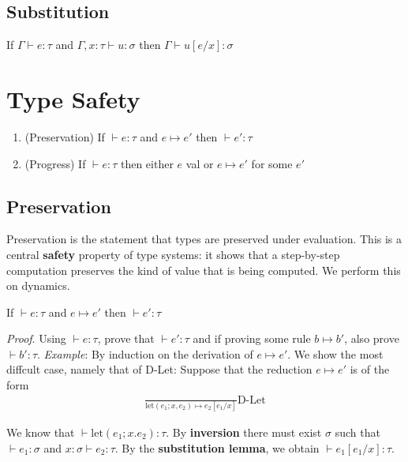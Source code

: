 \documentclass[11pt,a4paper,titlepage,dvipsnames,cmyk]{scrartcl}
\begin{document}
\subsection{Substitution}
\begin{tcolorbox} [space to upper,
collower=white,
title={Lemma 3 (Substitution)},
nobeforeafter,
halign lower=flush right, ]
If $\Gamma \vdash e : \tau$ and $\Gamma, x : \tau \vdash u : \sigma$ then $\Gamma \vdash u[e/x] : \sigma$
\end{tcolorbox}

\newpage
\section{Type Safety}

\begin{tcolorbox} [space to upper,
collower=white,
title={Theorem 1 (Type safety)},
nobeforeafter,
halign lower=flush right, ]
\begin{enumerate}
\item (Preservation) If $\vdash e : \tau$ and $e \mapsto e'$ then $\vdash e' : \tau$
\item (Progress) If $\vdash e : \tau$ then either $e$ val or $e \mapsto e'$ for some $e'$
\end{enumerate}
\end{tcolorbox}

\subsection{Preservation}
Preservation is the statement that types are preserved under evaluation. This is a central \textbf{safety} property of type systems: it shows that a step-by-step computation preserves the kind of value that is being computed. We perform this on dynamics.

\begin{tcolorbox} [space to upper,
collower=white,
title={Theorem 2 (Preservation)},
nobeforeafter,
halign lower=flush right, ]
If $\vdash e : \tau$ and $e \mapsto e'$ then $\vdash e' : \tau$

\textit{Proof}. Using $\vdash e : \tau$, prove that $\vdash e' : \tau$ and if proving some rule $b \longmapsto b'$, also prove $\vdash b' : \tau$.
\textit{Example}: By induction on the derivation of $e \mapsto e'$. We show the most diffcult case, namely that of D-Let: Suppose that the reduction $e \mapsto e'$ is of the form
\begin{align*}
\frac{}{\text{let}(e_1;x,e_2) \mapsto e_2 [e_1/x]}\text{D-Let}
\end{align*}

We know that $\vdash \text{let}(e_1;x.e_2) : \tau$. By \textbf{inversion} there must exist $\sigma$ such that $\vdash e_1 : \sigma$ and $x:\sigma \vdash e_2 : \tau$. By the \textbf{substitution lemma}, we obtain $\vdash e_1[e_1/x] : \tau$.
\end{tcolorbox}
\end{document}
